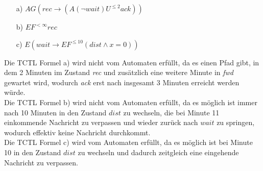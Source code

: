 

\begin{itemize}
	\item[a)] $AG(rec \rightarrow (A(\neg wait)U^{\leq2} ack))$ 
	\item[b)] $EF^{<\infty} rec$
	\item[c)] $E(wait \rightarrow EF^{\leq 10}(dist \wedge x=0))$	
\end{itemize}

Die TCTL Formel a) wird nicht vom Automaten erfüllt, da es einen Pfad gibt, in dem 2 Minuten im Zustand \textit{rec} und zusätzlich eine weitere Minute in \textit{fwd} gewartet wird, wodurch \textit{ack} erst nach insgesamt 3 Minuten erreicht werden würde. \\

Die TCTL Formel b) wird nicht vom Automaten erfüllt, da es möglich ist immer nach 10 Minuten in den Zustand $dist$ zu wechseln, die bei Minute 11 einkommende Nachricht zu verpassen und wieder zurück nach $wait$ zu springen, wodurch effektiv keine Nachricht durchkommt. \\

Die TCTL Formel c) wird vom Automaten erfüllt, da es möglich ist bei Minute 10 in den Zustand $dist$ zu wechseln und dadurch zeitgleich eine eingehende Nachricht zu verpassen.

